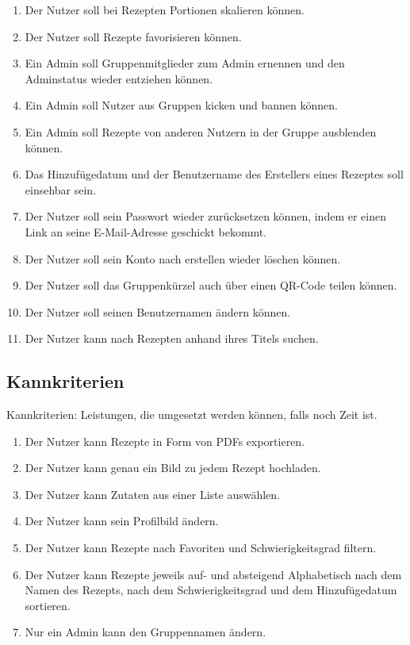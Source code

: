 \documentclass[parskip=full]{scrartcl}
\begin{document}
\begin{enumerate}[start=1,label={$\langle$\bfseries RS\arabic*$\rangle$}, leftmargin = 5em, itemsep=4pt, parsep=4pt]
    \item Der Nutzer soll bei Rezepten Portionen skalieren können.\label{rs:PortionScaling}
    \item Der Nutzer soll Rezepte favorisieren können.\label{rs:RecipeFavourites}
    \item Ein \Gls{Admin} soll Gruppenmitglieder zum Admin ernennen und den Adminstatus wieder entziehen können.\label{rs:AdminCreation}
    \item Ein Admin soll Nutzer aus Gruppen \Gls{kicken} und \Gls{bannen} können.\label{rs:Kicking}
    \item Ein Admin soll Rezepte von anderen Nutzern in der Gruppe ausblenden können.\label{rs:RecipeHiding}
    \item Das Hinzufügedatum und der Benutzername des Erstellers eines Rezeptes soll einsehbar sein.\label{rs:AuthorAndDate}
    \item Der Nutzer soll sein Passwort wieder zurücksetzen können, indem er einen Link an seine E-Mail-Adresse geschickt bekommt.\label{rs:ResetPassword}
    \item Der Nutzer soll sein Konto nach erstellen wieder löschen können.\label{rs:AccountDeletion}
    \item Der Nutzer soll das Gruppenkürzel auch über einen QR-Code teilen können.\label{rs:QRCode}
    \item Der Nutzer soll seinen Benutzernamen ändern können.\label{rs:ChangeUsername}
    \item Der Nutzer kann nach Rezepten anhand ihres Titels suchen.\label{rs:Searching}
\end{enumerate}

\subsection{Kannkriterien}
Kannkriterien: Leistungen, die umgesetzt werden können, falls noch Zeit ist.

\begin{enumerate}[start=1,label={$\langle$\bfseries RC\arabic*$\rangle$}, leftmargin = 5em, itemsep=4pt, parsep=4pt]
    \item Der Nutzer kann Rezepte in Form von PDFs exportieren.\label{rc:PDFExport}
    \item Der Nutzer kann genau ein Bild zu jedem Rezept hochladen.\label{rc:Images}
    \item Der Nutzer kann Zutaten aus einer Liste auswählen.\label{rc:IngredientList}
    \item Der Nutzer kann sein Profilbild ändern.\label{rc:ProfileImage}
    \item Der Nutzer kann Rezepte nach Favoriten und Schwierigkeitsgrad filtern.\label{rc:Filtering}
    \item Der Nutzer kann Rezepte jeweils auf- und absteigend Alphabetisch nach dem Namen des Rezepts, nach dem Schwierigkeitsgrad und dem Hinzufügedatum sortieren.\label{rc:Sorting}
    \item Nur ein Admin kann den Gruppennamen ändern.\label{rc:GroupRenaming}
\end{enumerate}
\end{document}
